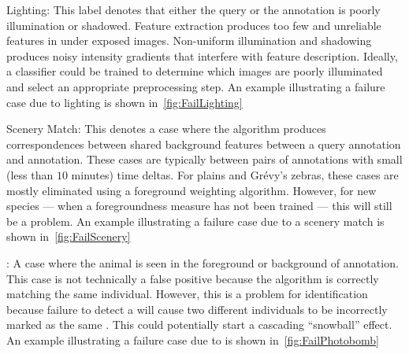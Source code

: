 \begin{itemln}
                \FailQuality{}

            \item Lighting:
            This label denotes that either the query or the \groundtrue{} annotation is poorly illumination or
              shadowed.
            Feature extraction produces too few and unreliable features in under exposed images.
            Non-uniform illumination and shadowing produces noisy intensity gradients that interfere with feature
              description.
            Ideally, a classifier could be trained to determine which images are poorly illuminated and select an
              appropriate preprocessing step.
            An example illustrating a failure case due to lighting is shown in~\cref{fig:FailLighting}

                \FailLighting{}

            \item Scenery Match:
            This denotes a case where the algorithm produces correspondences between shared background features
              between a query annotation and \aan{\groundfalse{}} annotation.
            These cases are typically between pairs of annotations with small (less than $10$ minutes) time
              deltas.
            For plains and Grévy's zebras, these cases are mostly eliminated using a foreground weighting
              algorithm.
            However, for new species --- when a foregroundness measure has not been trained --- this will still
              be a problem.
            An example illustrating a failure case due to a scenery match is shown in~\cref{fig:FailScenery}

              \FailScenery{}

            \item \Photobomb{}:
            A case where the \groundtrue{} animal is seen in the foreground or background of \aan{\groundfalse{}}
              annotation.
            This case is not technically a false positive because the algorithm is correctly matching the same
              individual.
            However, this is a problem for identification because failure to detect a \photobomb{} will cause two
              different individuals to be incorrectly marked as the same \name{}.
            This could potentially start a cascading ``snowball'' effect.
            An example illustrating a failure case due to \photobombing{} is shown in~\cref{fig:FailPhotobomb}

              \FailPhotobomb{}
        \end{itemln}


